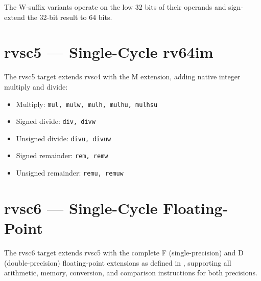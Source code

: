 The W-suffix variants operate on the low 32 bits of their operands and sign-extend the 32-bit result
to 64 bits.

\section{rvsc5 --- Single-Cycle rv64im}

The rvsc5 target extends rvsc4 with the M extension, adding native integer multiply and divide:

\begin{itemize}
  \item Multiply: \texttt{mul, mulw, mulh, mulhu, mulhsu}
  \item Signed divide: \texttt{div, divw}
  \item Unsigned divide: \texttt{divu, divuw}
  \item Signed remainder: \texttt{rem, remw}
  \item Unsigned remainder: \texttt{remu, remuw}
\end{itemize}

\section{rvsc6 --- Single-Cycle Floating-Point}

The rvsc6 target extends rvsc5 with the complete F (single-precision) and D (double-precision)
floating-point extensions as defined in \cite{riscv-spec}, supporting all arithmetic, memory,
conversion, and comparison instructions for both precisions.

